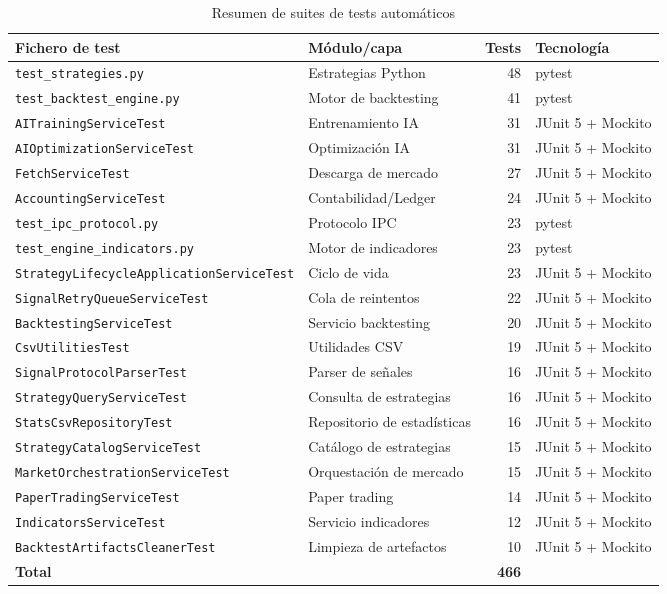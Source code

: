 \begin{table}[H]
    \centering
    \caption{Resumen de suites de tests automáticos}
    \label{tab:test_summary}
    \begin{tabular}{p{5.5cm} p{3.5cm} r p{3.0cm}}
    \hline
    \textbf{Fichero de test} & \textbf{Módulo/capa} & \textbf{Tests} & \textbf{Tecnología} \\
    \hline
    \texttt{test\_strategies.py} & Estrategias Python & 48 & pytest \\
    \texttt{test\_backtest\_engine.py} & Motor de backtesting & 41 & pytest \\
    \texttt{AITrainingServiceTest} & Entrenamiento IA & 31 & JUnit 5 + Mockito \\
    \texttt{AIOptimizationServiceTest} & Optimización IA & 31 & JUnit 5 + Mockito \\
    \texttt{FetchServiceTest} & Descarga de mercado & 27 & JUnit 5 + Mockito \\
    \texttt{AccountingServiceTest} & Contabilidad/Ledger & 24 & JUnit 5 + Mockito \\
    \texttt{test\_ipc\_protocol.py} & Protocolo IPC & 23 & pytest \\
    \texttt{test\_engine\_indicators.py} & Motor de indicadores & 23 & pytest \\
    \texttt{StrategyLifecycleApplicationServiceTest} & Ciclo de vida & 23 & JUnit 5 + Mockito \\
    \texttt{SignalRetryQueueServiceTest} & Cola de reintentos & 22 & JUnit 5 + Mockito \\
    \texttt{BacktestingServiceTest} & Servicio backtesting & 20 & JUnit 5 + Mockito \\
    \texttt{CsvUtilitiesTest} & Utilidades CSV & 19 & JUnit 5 + Mockito \\
    \texttt{SignalProtocolParserTest} & Parser de señales & 16 & JUnit 5 + Mockito \\
    \texttt{StrategyQueryServiceTest} & Consulta de estrategias & 16 & JUnit 5 + Mockito \\
    \texttt{StatsCsvRepositoryTest} & Repositorio de estadísticas & 16 & JUnit 5 + Mockito \\
    \texttt{StrategyCatalogServiceTest} & Catálogo de estrategias & 15 & JUnit 5 + Mockito \\
    \texttt{MarketOrchestrationServiceTest} & Orquestación de mercado & 15 & JUnit 5 + Mockito \\
    \texttt{PaperTradingServiceTest} & Paper trading & 14 & JUnit 5 + Mockito \\
    \texttt{IndicatorsServiceTest} & Servicio indicadores & 12 & JUnit 5 + Mockito \\
    \texttt{BacktestArtifactsCleanerTest} & Limpieza de artefactos & 10 & JUnit 5 + Mockito \\
    \hline
    \textbf{Total} & & \textbf{466} & \\
    \hline
    \end{tabular}
\end{table}

